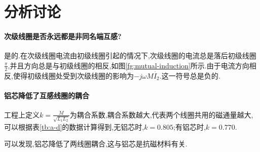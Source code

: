 \documentclass[UTF8,a4paper]{article}%
\begin{document}
\section{分析讨论}
\paragraph{次级线圈是否永远都是非同名端互感?}
是的.在次级线圈电流由初级线圈引起的情况下,次级线圈的电流总是落后初级线圈$\frac{\pi}{2}$,并且方向总是与初级线圈的相反,如图\ref{fg:mutual-induction}所示.由于电流方向相反,使得初级线圈处受到次级线圈的影响为$-j\omega M\dot{I_2}$.这一符号总是负的.
\paragraph{铝芯降低了互感线圈的耦合}
工程上定义$k=\frac{M}{\sqrt{L_1L_2}}$为耦合系数,耦合系数越大,代表两个线圈共用的磁通量越大,可以根据表\ref{tb:a-d}的数据计算得到,无铝芯时,$k=0.805$;有铝芯时,$k=0.770$.

可以发现,铝芯降低了两线圈耦合,这与铝芯是抗磁材料有关.
\end{document}
